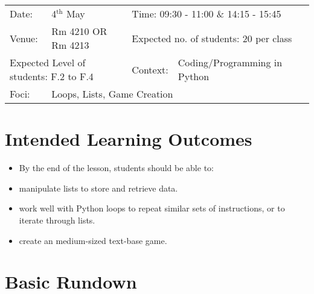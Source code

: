 \documentclass{article}
\begin{document}
\begin{center}

\begin{tabular}{lllll}
Date: & 4$^{\text{th}}$ May & \multicolumn{3}{l}{Time: 09:30 - 11:00 \& 14:15 - 15:45} \\
Venue: & Rm 4210 OR Rm 4213 & \multicolumn{3}{l}{Expected no. of students: 20 per class} \\
\multicolumn{2}{l}{Expected Level of students: F.2 to F.4} & Context: & Coding/Programming in Python &\\
Foci: & \multicolumn{4}{l}{Loops, Lists, Game Creation}
\end{tabular}

\end{center}

\section*{Intended Learning Outcomes}

\begin{itemize}
\item[] By the end of the lesson, students should be able to:
\item manipulate lists to store and retrieve data.
\item work well with Python loops to repeat similar sets of instructions, or to iterate through lists.
\item create an medium-sized text-base game.
\end{itemize}

\section*{Basic Rundown}
\end{document}
